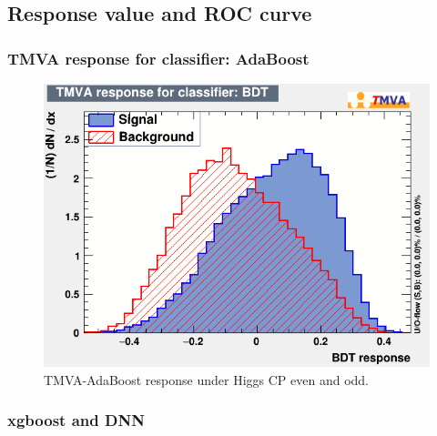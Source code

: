 \documentclass{beamer}
\begin{document}
\subsection{Response value and ROC curve}
\begin{frame}
\frametitle{TMVA response for classifier: AdaBoost}
\begin{figure}
\includegraphics[scale=0.25]{./figures/mva_BDT.png}
\caption{TMVA-AdaBoost response under Higgs CP even and odd.}
\end{figure}
\end{frame}

\begin{frame}
\frametitle{xgboost and DNN}
\begin{figure}[H]
\centering
{} 
\end{figure}
\end{frame}
\end{document}
